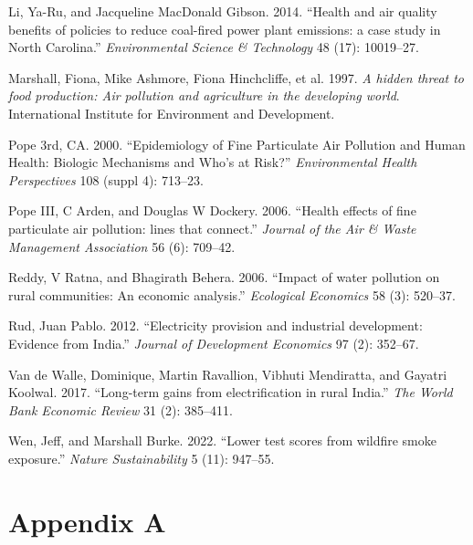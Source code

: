 \documentclass[
]{article}
\newlength{\cslhangindent}
\newlength{\cslentryspacingunit} %
\newenvironment{CSLReferences}[2] %
 {%
  \setlength{\parindent}{0pt}
  \ifodd #1
  \let\oldpar\par
  \def\par{\hangindent=\cslhangindent\oldpar}
  \fi
  \setlength{\parskip}{#2\cslentryspacingunit}
 }%
 {}
\begin{document}
\begin{CSLReferences}{1}{0}
\leavevmode{}%
Li, Ya-Ru, and Jacqueline MacDonald Gibson. 2014. {``{Health and air quality benefits of policies to reduce coal-fired power plant emissions: a case study in North Carolina}.''} \emph{{Environmental Science \& Technology}} 48 (17): 10019--27.

\leavevmode{}%
Marshall, Fiona, Mike Ashmore, Fiona Hinchcliffe, et al. 1997. \emph{{A hidden threat to food production: Air pollution and agriculture in the developing world}}. {International Institute for Environment and Development.}

\leavevmode{}%
Pope 3rd, CA. 2000. {``Epidemiology of Fine Particulate Air Pollution and Human Health: Biologic Mechanisms and Who's at Risk?''} \emph{{Environmental Health Perspectives}} 108 (suppl 4): 713--23.

\leavevmode{}%
Pope III, C Arden, and Douglas W Dockery. 2006. {``{Health effects of fine particulate air pollution: lines that connect}.''} \emph{{Journal of the Air \& Waste Management Association}} 56 (6): 709--42.

\leavevmode{}%
Reddy, V Ratna, and Bhagirath Behera. 2006. {``{Impact of water pollution on rural communities: An economic analysis}.''} \emph{{Ecological Economics}} 58 (3): 520--37.

\leavevmode{}%
Rud, Juan Pablo. 2012. {``{Electricity provision and industrial development: Evidence from India}.''} \emph{{Journal of Development Economics}} 97 (2): 352--67.

\leavevmode{}%
Van de Walle, Dominique, Martin Ravallion, Vibhuti Mendiratta, and Gayatri Koolwal. 2017. {``{Long-term gains from electrification in rural India}.''} \emph{{The World Bank Economic Review}} 31 (2): 385--411.

\leavevmode{}%
Wen, Jeff, and Marshall Burke. 2022. {``{Lower test scores from wildfire smoke exposure}.''} \emph{{Nature Sustainability}} 5 (11): 947--55.

\end{CSLReferences}

\FloatBarrier
\newpage

\hypertarget{appendix-a}{%
\section*{Appendix A}\label{appendix-a}}
\end{document}
